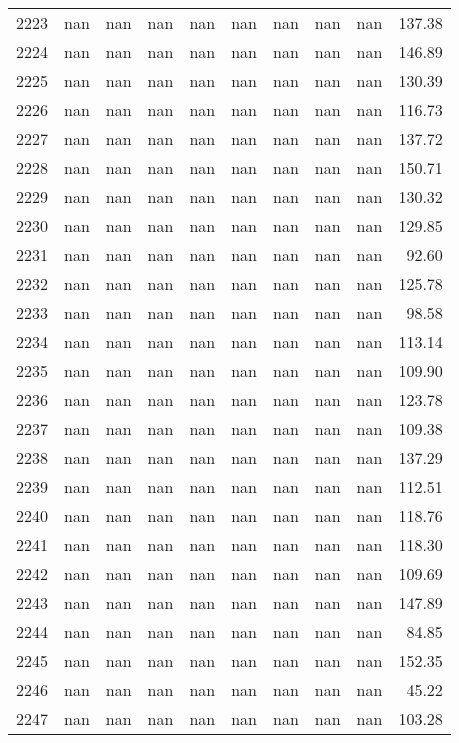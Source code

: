 \begin{tabular}{lrrrrrrrrr}
2223 & nan & nan & nan & nan & nan & nan & nan & nan & 137.38 \\
2224 & nan & nan & nan & nan & nan & nan & nan & nan & 146.89 \\
2225 & nan & nan & nan & nan & nan & nan & nan & nan & 130.39 \\
2226 & nan & nan & nan & nan & nan & nan & nan & nan & 116.73 \\
2227 & nan & nan & nan & nan & nan & nan & nan & nan & 137.72 \\
2228 & nan & nan & nan & nan & nan & nan & nan & nan & 150.71 \\
2229 & nan & nan & nan & nan & nan & nan & nan & nan & 130.32 \\
2230 & nan & nan & nan & nan & nan & nan & nan & nan & 129.85 \\
2231 & nan & nan & nan & nan & nan & nan & nan & nan & 92.60 \\
2232 & nan & nan & nan & nan & nan & nan & nan & nan & 125.78 \\
2233 & nan & nan & nan & nan & nan & nan & nan & nan & 98.58 \\
2234 & nan & nan & nan & nan & nan & nan & nan & nan & 113.14 \\
2235 & nan & nan & nan & nan & nan & nan & nan & nan & 109.90 \\
2236 & nan & nan & nan & nan & nan & nan & nan & nan & 123.78 \\
2237 & nan & nan & nan & nan & nan & nan & nan & nan & 109.38 \\
2238 & nan & nan & nan & nan & nan & nan & nan & nan & 137.29 \\
2239 & nan & nan & nan & nan & nan & nan & nan & nan & 112.51 \\
2240 & nan & nan & nan & nan & nan & nan & nan & nan & 118.76 \\
2241 & nan & nan & nan & nan & nan & nan & nan & nan & 118.30 \\
2242 & nan & nan & nan & nan & nan & nan & nan & nan & 109.69 \\
2243 & nan & nan & nan & nan & nan & nan & nan & nan & 147.89 \\
2244 & nan & nan & nan & nan & nan & nan & nan & nan & 84.85 \\
2245 & nan & nan & nan & nan & nan & nan & nan & nan & 152.35 \\
2246 & nan & nan & nan & nan & nan & nan & nan & nan & 45.22 \\
2247 & nan & nan & nan & nan & nan & nan & nan & nan & 103.28 \\

\end{tabular}
